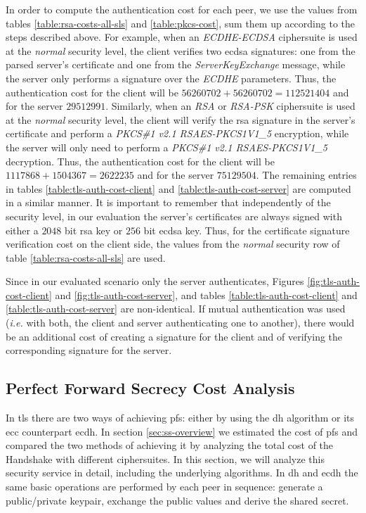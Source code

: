 In order to compute the authentication cost for each peer, we use the values from tables \ref{table:rsa-costs-all-sls} and \ref{table:pkcs-cost},
sum them up according to the steps described above. For example, when an \textit{ECDHE-ECDSA} ciphersuite is used at the \textit{normal} security level,
the client verifies two \gls{ecdsa} signatures: one from the parsed server's certificate
and one from the \textit{ServerKeyExchange} message, while the server only performs a signature over the \textit{ECDHE} parameters.
Thus, the authentication cost for the client will be $56260702+56260702=112521404$ and for the server $29512991$. Similarly, when an \textit{RSA} or
\textit{RSA-PSK} ciphersuite is used at the \textit{normal} security level, the client will verify the \gls{rsa} signature in the server's certificate
and perform a \textit{PKCS\#1 v2.1 RSAES-PKCS1\-V1\_5} encryption, while the server will only need to perform a
\textit{PKCS\#1 v2.1 RSAES-PKCS1\-V1\_5} decryption. Thus, the authentication cost for the client will be $1117868+1504367=2622235$ and for the server
$75129504$. The remaining entries in tables \ref{table:tls-auth-cost-client} and \ref{table:tls-auth-cost-server} are computed in a similar manner.
It is important to remember that independently of the security level, in our evaluation the server's certificates are always signed with either a 
$2048$ bit \gls{rsa} key or $256$ bit \gls{ecdsa} key. Thus, for the certificate signature verification cost on the client side, 
the values from the \textit{normal} security row of table \ref{table:rsa-costs-all-sls} are used.

Since in our evaluated scenario only the server authenticates, Figures \ref{fig:tls-auth-cost-client} and \ref{fig:tls-auth-cost-server}, and tables \ref{table:tls-auth-cost-client} and \ref{table:tls-auth-cost-server}
are non-identical. If mutual authentication was used (\textit{i.e.} with both, the client and server authenticating one to another), there would be
an additional cost of creating a signature for the client and of verifying the corresponding signature for the server.

\subsection{Perfect Forward Secrecy Cost Analysis} \label{sec:pfs-costs}

In \gls{tls} there are two ways of achieving \gls{pfs}: either by using the \gls{dh} algorithm or its \gls{ecc} counterpart \gls{ecdh}.
In section \ref{sec:ss-overview} we estimated the cost of \gls{pfs} and compared the two methods of achieving it by analyzing the total cost of the
Handshake with different ciphersuites. In this section, we will analyze this security service in detail, including the underlying algorithms.
In \gls{dh} and \gls{ecdh} the same basic operations are performed by each peer in sequence: generate a public/private keypair, exchange the public values
and derive the shared secret.

